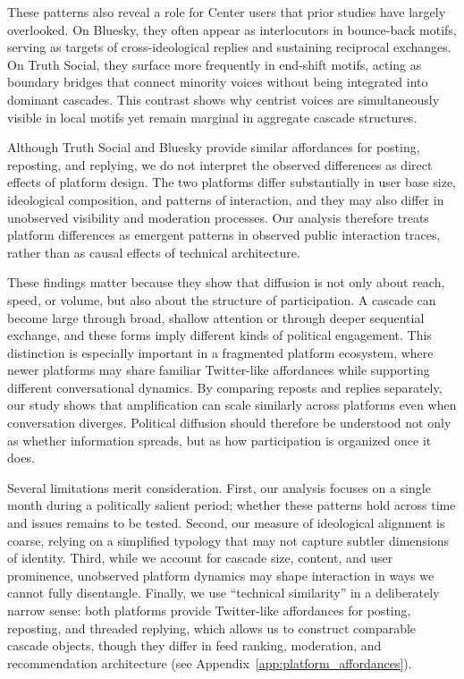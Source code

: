 \documentclass[letterpaper]{article} %
\begin{document}
These patterns also reveal a role for Center users that prior studies have largely overlooked. On Bluesky, they often appear as interlocutors in bounce-back motifs, serving as targets of cross-ideological replies and sustaining reciprocal exchanges. On Truth Social, they surface more frequently in end-shift motifs, acting as boundary bridges that connect minority voices without being integrated into dominant cascades. This contrast shows why centrist voices are simultaneously visible in local motifs yet remain marginal in aggregate cascade structures.

Although Truth Social and Bluesky provide similar affordances for posting, reposting, and replying, we do not interpret the observed differences as direct effects of platform design. The two platforms differ substantially in user base size, ideological composition, and patterns of interaction, and they may also differ in unobserved visibility and moderation processes. Our analysis therefore treats platform differences as emergent patterns in observed public interaction traces, rather than as causal effects of technical architecture.

These findings matter because they show that diffusion is not only about reach, speed, or volume, but also about the structure of participation. A cascade can become large through broad, shallow attention or through deeper sequential exchange, and these forms imply different kinds of political engagement. This distinction is especially important in a fragmented platform ecosystem, where newer platforms may share familiar Twitter-like affordances while supporting different conversational dynamics. By comparing reposts and replies separately, our study shows that amplification can scale similarly across platforms even when conversation diverges. Political diffusion should therefore be understood not only as whether information spreads, but as how participation is organized once it does.

Several limitations merit consideration. First, our analysis focuses on a single month during a politically salient period; whether these patterns hold across time and issues remains to be tested. Second, our measure of ideological alignment is coarse, relying on a simplified typology that may not capture subtler dimensions of identity. Third, while we account for cascade size, content, and user prominence, unobserved platform dynamics may shape interaction in ways we cannot fully disentangle. Finally, we use ``technical similarity'' in a deliberately narrow sense: both platforms provide Twitter-like affordances for posting, reposting, and threaded replying, which allows us to construct comparable cascade objects, though they differ in feed ranking, moderation, and recommendation architecture (see Appendix~\ref{app:platform_affordances}).
\end{document}
